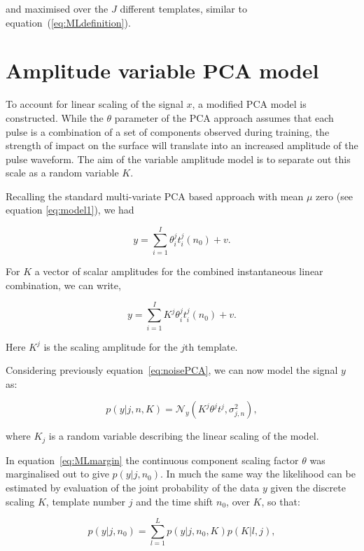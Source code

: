 and maximised over the $J$ different templates, similar to equation~(\ref{eq:MLdefinition}).

\section{Amplitude variable PCA model}\label{sec:KamplitudeModel}

To account for linear scaling of the signal $x$, a modified PCA model is constructed. While the $\theta$ parameter of the PCA approach assumes that each pulse is a combination of a set of components observed during training, the strength of impact on the surface will translate into an increased amplitude of the pulse waveform. The aim of the variable amplitude model is to separate out this scale as a random variable $K$.

Recalling the standard multi-variate PCA based approach with mean $\mu$ zero (see equation \ref{eq:model1}), we had

\begin{equation}\label{eq:K_PCAmodel}
y = \sum^I_{i=1} \theta^j_i t^j_i(n_0) + v.
\end{equation}

For $K$ a vector of scalar amplitudes for the combined instantaneous linear combination, we can write,

\begin{equation}\label{eq:Kmodel}
y = \sum^I_{i=1} K^j \theta^j_i t^j_i(n_0) + v.
\end{equation}

Here $K^j$ is the scaling amplitude for the $j$th template.

Considering previously equation~\ref{eq:noisePCA}, we can now model the signal $y$ as:

\begin{equation}\label{eq:GP2}
    p(y|j,n,K) = \mathcal{N}_y(K^j \theta^j t^j , \sigma_{j,n}^2),
\end{equation}

where $K_j$ is a random variable describing the linear scaling of the model.

In equation~\ref{eq:MLmargin} the continuous component scaling factor $\theta$ was marginalised out to give $p(y|j,n_0)$. In much the same way the likelihood can be estimated by evaluation of the joint probability of the data $y$ given the discrete scaling $K$, template number $j$ and the time shift $n_0$, over $K$, so that:

\begin{equation}\label{eq:MLmarginK}
p(y|j,n_0)=\sum_{l=1}^L p(y|j, n_0, K) p(K| l, j),
\end{equation}

